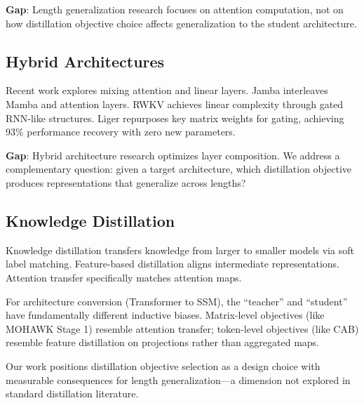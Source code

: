 \textbf{Gap}: Length generalization research focuses on attention computation, not on how distillation objective choice affects generalization to the student architecture.

\subsection{Hybrid Architectures}

Recent work explores mixing attention and linear layers. Jamba \citep{lieber2024jamba} interleaves Mamba and attention layers. RWKV \citep{peng2023rwkv} achieves linear complexity through gated RNN-like structures. Liger \citep{lan2025liger} repurposes key matrix weights for gating, achieving 93\% performance recovery with zero new parameters.

\textbf{Gap}: Hybrid architecture research optimizes layer composition. We address a complementary question: given a target architecture, which distillation objective produces representations that generalize across lengths?

\subsection{Knowledge Distillation}

Knowledge distillation \citep{hinton2015distilling} transfers knowledge from larger to smaller models via soft label matching. Feature-based distillation \citep{romero2015fitnets} aligns intermediate representations. Attention transfer \citep{zagoruyko2017attention} specifically matches attention maps.

For architecture conversion (Transformer to SSM), the ``teacher'' and ``student'' have fundamentally different inductive biases. Matrix-level objectives (like MOHAWK Stage 1) resemble attention transfer; token-level objectives (like CAB) resemble feature distillation on projections rather than aggregated maps.

Our work positions distillation objective selection as a design choice with measurable consequences for length generalization---a dimension not explored in standard distillation literature.
